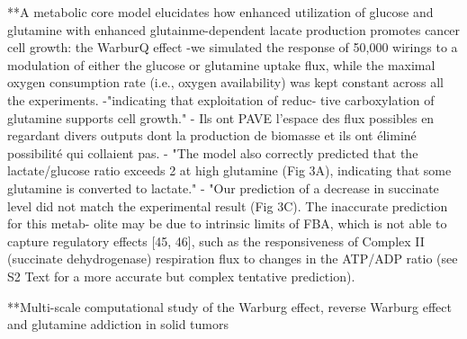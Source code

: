 \documentclass[11pt,a4paper]{article}
\begin{document}
**A metabolic core model elucidates how enhanced utilization of glucose and glutamine with enhanced glutainme-dependent lacate production promotes cancer cell growth: the WarburQ effect
-we simulated the response of 50,000 wirings to a modulation of either the glucose or glutamine uptake flux, while the maximal oxygen consumption rate (i.e., oxygen availability) was kept constant across all the experiments.
-"indicating that exploitation of reduc-
tive carboxylation of glutamine supports cell growth."
- Ils ont PAVE l'espace des flux possibles en regardant divers outputs dont la production de biomasse et ils ont éliminé possibilité qui collaient pas.
- "The model also correctly predicted that the lactate/glucose ratio exceeds 2 at high glutamine (Fig 3A), indicating that some glutamine is converted to lactate."
- "Our prediction of a decrease in succinate
level did not match the experimental result (Fig 3C). The inaccurate prediction for this metab-
olite may be due to intrinsic limits of FBA, which is not able to capture regulatory effects [45,
46], such as the responsiveness of Complex II (succinate dehydrogenase) respiration flux to
changes in the ATP/ADP ratio (see S2 Text for a more accurate but complex tentative
prediction).

**Multi-scale computational study of the Warburg effect, reverse Warburg effect and glutamine addiction in solid tumors
\end{document}
